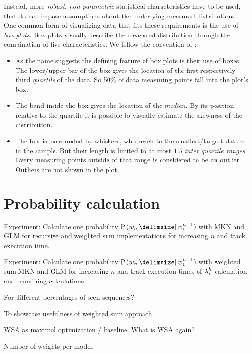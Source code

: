 Instead, more \emph{robust}, \emph{non-parametric} statistical characteristics
have to be used, that do not impose assumptions about the underlying
measured distributions.
One common form of visualizing data that fits these requirements is the use of
\emph{box plots}.
Box plots visually describe the measured distribution through the combination of
five characteristics.
We follow the convention of \textcite{Tukey1977}:
\begin{itemize}
  \item As the name suggests the defining feature of box plots is their use of
    boxes.
    The lower/upper bar of the box gives the location of the first
    respectively third \emph{quartile} of the data.
    So 50\% of data measuring points fall into the plot's box.
  \item The band inside the box gives the location of the \emph{median}.
    By its position relative to the quartile it is possible to visually estimate
    the skewness of the distribution.
  \item The box is surrounded by whiskers, who reach to the smallest/largest
    datum in the sample.
    But their length is limited to at most $1.5$ \emph{inter quartile ranges}.
    Every measuring points outside of that range is considered to be an outlier.
    Outliers are not shown in the plot.
\end{itemize}

\section{Probability calculation}
\label{sec:evaluation-weightedsum}

\begin{draft}
Experiment: Calculate one probability $\Prob{w_n}{w_1^{n-1}}$ with MKN and GLM
for recursive and weighted sum implementations for increasing $n$ and track
execution time.

Experiment: Calculate one probability $\Prob{w_n}{w_1^{n-1}}$ with weighted sum
MKN and GLM for increasing $n$ and track execution times of $\lambda^h_i$
calculation and remaining calculations.

For different percentages of seen sequences?

To showcase usefulness of weighted sum approach.

WSA as maximal optimization / baseline.
What is WSA again?

Number of weights per model.
\end{draft}

